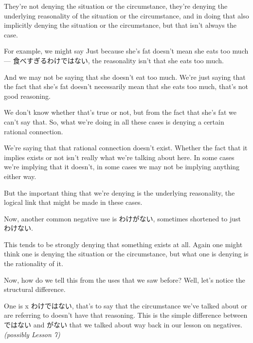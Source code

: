 They're not denying the situation or the circumstance, they're denying the underlying reasonality of the situation or the circumstance, and in doing that also implicitly denying the situation or the circumstance, but that isn't always the case.

For example, we might say Just because she's fat doesn't mean she eats too much --- 食べすぎるわけではない, the reasonality isn't that she eats too much.

{}

And we may not be saying that she doesn't eat too much. We're just saying that the fact that she's fat doesn't necessarily mean that she eats too much, that's not good reasoning.

We don't know whether that's true or not, but from the fact that she's fat we can't say that. So, what we're doing in all these cases is denying a certain rational connection.

We're saying that that rational connection doesn't exist. Whether the fact that it implies exists or not isn't really what we're talking about here. In some cases we're implying that it doesn't, in some cases we may not be implying anything either way.

But the important thing that we're denying is the underlying reasonality, the logical link that might be made in these cases.

\stopsectionlevel

\stopsectionlevel

\startsectionlevel[title={わけない / 訳ない (訳がない)},reference={わけない-訳ない-訳がない}]

Now, another common negative use is わけがない, sometimes shortened to just わけない.

{}

This tends to be strongly denying that something exists at all. Again one might think one is denying the situation or the circumstance, but what one is denying is the rationality of it.

Now, how do we tell this from the uses that we saw before? Well, let's notice the structural difference.

One is x わけではない, that's to say that the circumstance we've talked about or are referring to doesn't have that reasoning. This is the simple difference between ではない and がない that we talked about way back in our lesson on negatives. {\em (possibly Lesson 7)}

